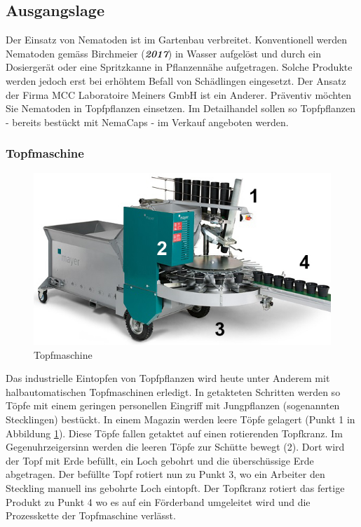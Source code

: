 
\subsection{Ausgangslage}
Der Einsatz von Nematoden ist im Gartenbau verbreitet. Konventionell werden Nematoden gemäss Birchmeier (\textbf{\textit{2017}}) in Wasser aufgelöst und durch ein Dosiergerät oder eine Spritzkanne in Pflanzennähe aufgetragen. Solche Produkte werden jedoch erst bei erhöhtem Befall von Schädlingen eingesetzt. Der Ansatz der Firma MCC Laboratoire Meiners GmbH ist ein Anderer. Präventiv möchten Sie Nematoden in Topfpflanzen einsetzen. Im Detailhandel sollen so Topfpflanzen - bereits bestückt mit NemaCaps - im Verkauf angeboten werden. 
\subsubsection{Topfmaschine}
\begin{figure}
	\includegraphics[scale=0.5]{Illustrationen/3-Einleitung/schema_topfmaschine.jpg}
	\caption{Topfmaschine}
	\label{fig:schema_topfmaschine}
\end{figure}
Das industrielle Eintopfen von Topfpflanzen wird heute unter Anderem mit halbautomatischen Topfmaschinen erledigt. In getakteten Schritten werden so Töpfe mit einem geringen personellen Eingriff mit Jungpflanzen (sogenannten Stecklingen) bestückt. In einem Magazin werden leere Töpfe gelagert (Punkt 1 in Abbildung \ref{fig:schema_topfmaschine}). Diese Töpfe fallen getaktet auf einen rotierenden Topfkranz. Im Gegenuhrzeigersinn werden die leeren Töpfe zur Schütte bewegt (2). Dort wird der Topf mit Erde befüllt, ein Loch gebohrt und die überschüssige Erde abgetragen. Der befüllte Topf rotiert nun zu Punkt 3, wo ein Arbeiter den Steckling manuell ins gebohrte Loch eintopft. Der Topfkranz rotiert das fertige Produkt zu Punkt 4 wo es auf ein Förderband umgeleitet wird und die Prozesskette der Topfmaschine verlässt.


